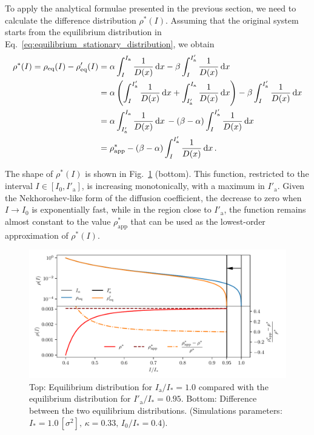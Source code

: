 To apply the analytical formulae presented in the previous section, we need to calculate the difference distribution $\rho^\ast(I)$. Assuming that the original system starts from the equilibrium distribution in Eq.~\eqref{eq:equilibrium_stationary_distribution}, we obtain 
\begin{align}
    \rho^\ast(I) = \rho_\text{eq}(I) - \rho'_\text{eq}(I) 
    &= \alpha \int_I^{I_\mathrm{a}} \frac{1}{D(x)}\,\mathrm{d}x - \beta \int_I^{I'_\mathrm{a}} \frac{1}{D(x)}\,\mathrm{d}x \notag \\
    &= \alpha \left( 
          \int_{I}^{I'_\mathrm{a}} \frac{1}{D(x)}\,\mathrm{d}x 
        + \int_{I'_\mathrm{a}}^{I_\mathrm{a}} \frac{1}{D(x)}\,\mathrm{d}x \right) - \beta \int_I^{I'_\mathrm{a}} \frac{1}{D(x)}\,\mathrm{d}x \notag \\
    &=  \alpha \int_{I'_\mathrm{a}}^{I_\mathrm{a}} \frac{1}{D(x)}\,\mathrm{d}x \, - (\beta - \alpha) \int_{I}^{I'_\mathrm{a}} \frac{1}{D(x)}\,\mathrm{d}x \notag \\
    &=  \rho^\ast_\text{app} - (\beta - \alpha) \int_{I}^{I'_\mathrm{a}} \frac{1}{D(x)}\,\mathrm{d}x \, .
    \label{eq:inward_difference}
\end{align}

The shape of $\rho^\ast(I)$ is shown in Fig.~\ref{fig:4} (bottom). This function, restricted to the interval $I \in [I_0, I'_\mathrm{a}]$, is increasing monotonically, with a maximum in $I'_\mathrm{a}$. Given the Nekhoroshev-like form of the diffusion coefficient, the decrease to zero when $I \to I_0$ is exponentially fast, while in the region close to $I'_\mathrm{a}$, the function remains almost constant to the value $\rho^\ast_\text{app}$ that can be used as the lowest-order approximation of $\rho^\ast(I)$.

\begin{figure}[t]
    \centering
    \includegraphics[width=\textwidth]{4_probing_the_diffusive_behavior/figs/final/difference_backwards_s.pdf}
    \caption{Top: Equilibrium distribution for $I_\mathrm{a}/I_\ast = 1.0$ compared with the  equilibrium distribution for $I'_\mathrm{a}/I_\ast = 0.95$. Bottom: Difference between the two equilibrium distributions. (Simulations parameters: $I_\ast = 1.0\,[\sigma^2],\, \kappa = 0.33,\, I_0/I_\ast = 0.4$).}
    \label{fig:4}
\end{figure}

